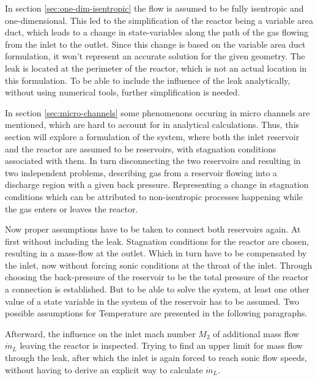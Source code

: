 In section \ref{sec:one-dim-isentropic} the flow is assumed to be fully isentropic and one-dimensional.
This led to the simplification of the reactor being a variable area duct, which leads to a change in state-variables along the path of the gas flowing from the inlet to the outlet.
Since this change is based on the variable area duct formulation, it won't represent an accurate solution for the given geometry.
The leak is located at the perimeter of the reactor, which is not an actual location in this formulation.
To be able to include the influence of the leak analytically, without using numerical tools, further simplification is needed.

In section \ref{sec:micro-channels} some phenomenons occuring in micro channels are mentioned, which are hard to account for in analytical calculations.
Thus, this section will explore a formulation of the system, where both the inlet reservoir and the reactor are assumed to be reservoirs, with stagnation conditions associated with them.
In turn disconnecting the two reservoirs and resulting in two independent problems, describing gas from a reservoir flowing into a discharge region with a given back pressure. 
Representing a change in stagnation conditions which can be attributed to non-isentropic processes happening while the gas enters or leaves the reactor.

Now proper assumptions have to be taken to connect both reservoirs again.
At first without including the leak.
Stagnation conditions for the reactor are chosen, resulting in a mass-flow at the outlet.
Which in turn have to be compensated by the inlet, now without forcing sonic conditions at the throat of the inlet.
Through choosing the back-pressure of the reservoir to be the total pressure of the reactor a connection is established.
But to be able to solve the system, at least one other value of a state variable in the system of the reservoir has to be assumed.
Two possible assumptions for Temperature are presented in the following paragraphs.

Afterward, the influence on the inlet mach number $M_2$ of additional mass flow $\dot{m}_L$ leaving the reactor is inspected.
Trying to find an upper limit for mass flow through the leak, after which the inlet is again forced to reach sonic flow speeds, without having to derive an explicit way to calculate $\dot{m}_L$.
\newpage

